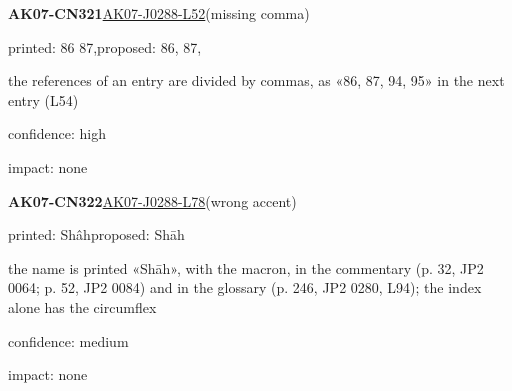 \documentclass[11pt]{article}
\begin{document}
\noindent\textbf{AK07-CN321}\enspace\hyperlink{AK07-J0288-L52}{AK07-J0288-L52}\enspace(missing comma)\par\noindent printed: 86 87,\enspace proposed: 86, 87,\par\noindent the references of an entry are divided by commas, as «86, 87, 94, 95» in the next entry (L54)\par\noindent confidence: high\par\noindent impact: none\par\medskip
\noindent\textbf{AK07-CN322}\enspace\hyperlink{AK07-J0288-L78}{AK07-J0288-L78}\enspace(wrong accent)\par\noindent printed: Shâh\enspace proposed: Shāh\par\noindent the name is printed «Shāh», with the macron, in the commentary (p. 32, JP2 0064; p. 52, JP2 0084) and in the glossary (p. 246, JP2 0280, L94); the index alone has the circumflex\par\noindent confidence: medium\par\noindent impact: none\par\medskip
\end{document}
